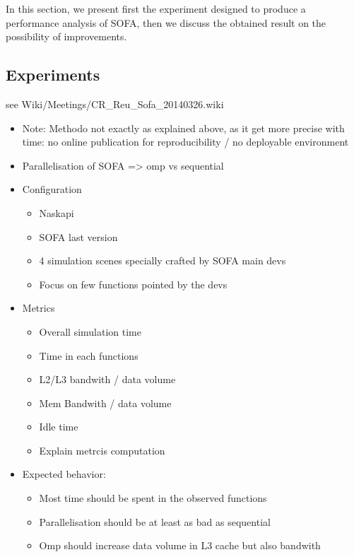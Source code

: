 In this section, we present first the experiment designed to produce a
performance analysis of \gls{SOFA}, then we discuss the obtained result on the
possibility of improvements.

\subsection{Experiments}

see Wiki/Meetings/CR\_Reu\_Sofa\_20140326.wiki
\begin{itemize}
    \item  Note: Methodo not exactly as explained above, as it get more
        precise with time: no online publication for reproducibility / no
        deployable environment
    \item Parallelisation of SOFA => omp vs sequential
    \item Configuration
        \begin{itemize}
            \item Naskapi
            \item SOFA last version
            \item 4 simulation scenes specially crafted by SOFA main devs
            \item Focus on few functions pointed by the devs
        \end{itemize}
    \item Metrics
        \begin{itemize}
            \item Overall simulation time
            \item Time in each functions
            \item L2/L3 bandwith / data volume
            \item Mem Bandwith / data volume
            \item Idle time
            \item Explain metrcis computation
        \end{itemize}
    \item Expected behavior:
        \begin{itemize}
            \item Most time should be spent in the observed functions
            \item Parallelisation should be at least as bad as sequential
            \item Omp should increase data volume in L3 cache but also
                bandwith
        \end{itemize}
\end{itemize}


